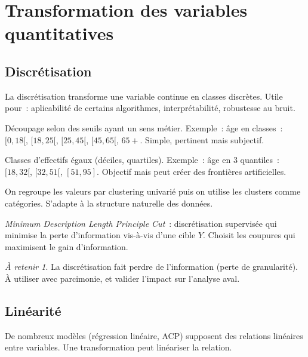 \documentclass[a4paper,11pt]{article}
\theoremstyle{definition}
\theoremstyle{remark}
\newtheorem*{important}{À retenir}
\begin{document}
\section{Transformation des variables quantitatives}

\subsection{Discrétisation}

La discrétisation transforme une variable continue en classes discrètes.
Utile pour~: aplicabilité de certains algorithmes, interprétabilité,
robustesse au bruit.

\begin{description}[style=nextline]
  \item[Règles métier] Découpage selon des seuils ayant un sens métier.
    Exemple~: âge en classes~: $[0,18[$, $[18,25[$, $[25,45[$, $[45,65[$,
    $65+$. Simple, pertinent mais subjectif.
  \item[Quantiles] Classes d'effectifs égaux (déciles, quartiles).
    Exemple~: âge en 3 quantiles~: $[18,32[$, $[32,51[$, $[51,95]$.
    Objectif mais peut créer des frontières artificielles.
  \item[CAH / $k$-means] On regroupe les valeurs par clustering univarié
    puis on utilise les clusters comme catégories. S'adapte à la structure
    naturelle des données.
  \item[MDLPC] \textit{Minimum Description Length Principle Cut}~:
    discrétisation supervisée qui minimise la perte d'information vis-à-vis
    d'une cible $Y$. Choisit les coupures qui maximisent le gain d'information.
\end{description}

\begin{important}
  La discrétisation fait perdre de l'information (perte de granularité).
  À utiliser avec parcimonie, et valider l'impact sur l'analyse aval.
\end{important}

\subsection{Linéarité}

De nombreux modèles (régression linéaire, ACP) supposent des relations
linéaires entre variables. Une transformation peut linéariser la relation.
\end{document}
